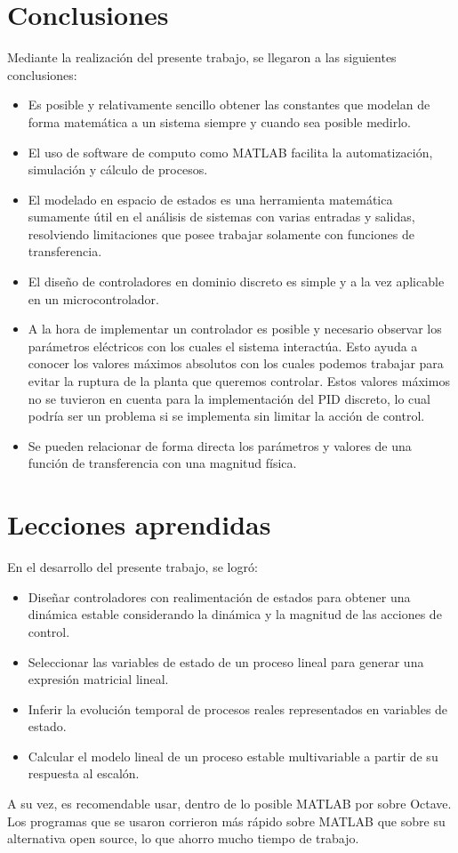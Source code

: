 \documentclass{article}
\begin{document}
\section{Conclusiones}
\label{section:3}
Mediante la realización del presente trabajo, se llegaron a las siguientes
conclusiones:
\begin{itemize}
  \item Es posible y relativamente sencillo obtener las constantes que modelan de forma matemática a un sistema
  siempre y cuando sea posible medirlo.
  \item El uso de software de computo como MATLAB facilita la automatización, simulación y cálculo de procesos.
  \item El modelado en espacio de estados es una herramienta matemática sumamente útil en el análisis de 
  sistemas con varias entradas y salidas, resolviendo limitaciones que posee trabajar solamente con funciones
  de transferencia.
  \item El diseño de controladores en dominio discreto es simple y a la vez aplicable en un microcontrolador.
  \item A la hora de implementar un controlador es posible y necesario observar los parámetros eléctricos con los
  cuales el sistema interactúa. Esto ayuda a conocer los valores máximos absolutos con los cuales podemos trabajar
  para evitar la ruptura de la planta que queremos controlar. Estos valores máximos no se tuvieron en cuenta para la 
  implementación del PID discreto, lo cual podría ser un problema si se implementa sin limitar la acción de control.
  \item Se pueden relacionar de forma directa los parámetros y valores de una función de transferencia con una magnitud física.
\end{itemize}


\section{Lecciones aprendidas}
\label{section:4}
En el desarrollo del presente trabajo, se logró:
\begin{itemize}
  \item Diseñar controladores con realimentación de estados para obtener una dinámica estable considerando la dinámica y la magnitud de las acciones de control.
  \item Seleccionar las variables de estado de un proceso lineal para generar una expresión matricial lineal.
  \item Inferir la evolución temporal de procesos reales representados en variables de estado.
  \item Calcular el modelo lineal de un proceso estable multivariable a partir de su respuesta al escalón.
\end{itemize}
A su vez, es recomendable usar, dentro de lo posible MATLAB por sobre Octave. Los programas que se usaron
corrieron más rápido sobre MATLAB que sobre su alternativa open source, lo que ahorro mucho tiempo de trabajo.
\end{document}
